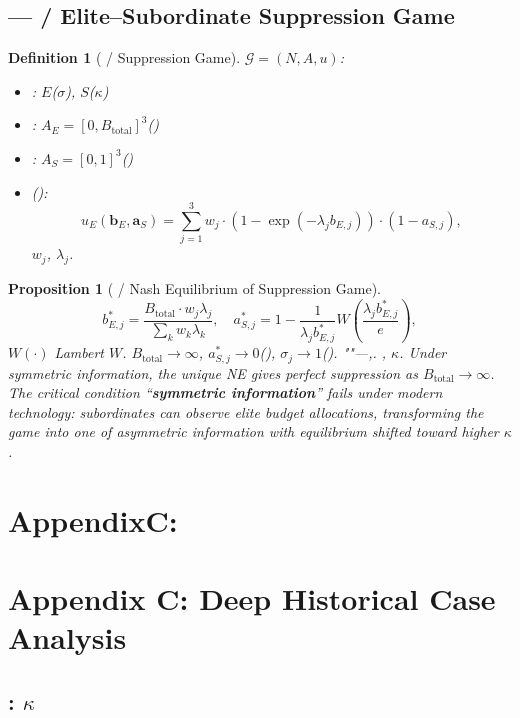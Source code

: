 \documentclass[11pt,a4paper]{article}
\newtheorem{proposition}[theorem]{Proposition}
\newtheorem{definition}[theorem]{Definition}
\theoremstyle{definition}
\newcommand{\coupling}{\kappa}
\newcommand{\suppress}{\sigma}
\newcommand{\paren}[1]{\left(#1\right)}
\begin{document}
\subsection{--- / Elite--Subordinate Suppression Game}
\begin{definition}[ / Suppression Game]
\label{def:game}
 $\mathcal{G} = (N, A, u)$: 
\begin{itemize}
 \item : $E$($\suppress$), $S$($\coupling$)
 \item : $A_E = [0, B_{\text{total}}]^3$()
 \item : $A_S = [0,1]^3$()
 \item (): 
 \[
 u_E(\bm{b}_E, \bm{a}_S) = \sum_{j=1}^{3} w_j \cdot
 \paren{1 - \exp(-\lambda_j b_{E,j})} \cdot (1 - a_{S,j}),
 \]
 $w_j$, $\lambda_j$.
\end{itemize}
\end{definition}
\begin{proposition}[ / Nash Equilibrium of Suppression Game]
\label{prop:nash}
\[
b_{E,j}^* = \frac{B_{\text{total}} \cdot w_j \lambda_j}{\sum_k w_k \lambda_k},
\quad
a_{S,j}^* = 1 - \frac{1}{\lambda_j b_{E,j}^*} W\paren{\frac{\lambda_j b_{E,j}^*}{e}},
\]
 $W(\cdot)$ Lambert $W$. $B_{\text{total}} \to \infty$, 
$a_{S,j}^* \to 0$(), $\suppress_j \to 1$().
""---,.
, $\coupling$.
Under symmetric information, the unique NE gives perfect suppression as $B_{\text{total}} \to \infty$.
The critical condition ``\textbf{symmetric information}'' fails under modern technology:
subordinates can observe elite budget allocations, transforming the game into one of
asymmetric information with equilibrium shifted toward higher $\coupling$.
\end{proposition}
\section{AppendixC:}
\section{Appendix C: Deep Historical Case Analysis}
\subsection{: $\coupling$}
\end{document}
